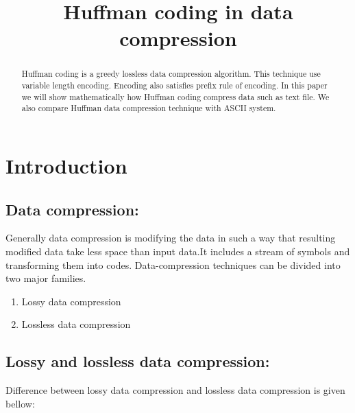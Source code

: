 \documentclass[conference]{IEEEtran}
\begin{document}
\title{Huffman coding in data compression}
\author{

}

\date{}
\maketitle


\begin{abstract}
Huffman coding is a greedy lossless data compression algorithm. This technique  use   variable length encoding. Encoding also satisfies prefix rule of encoding. In this paper we will show mathematically how Huffman coding  compress data such as text file. We also compare Huffman data compression technique with ASCII system.
    
\end{abstract}
\section{Introduction}
\label{sec:intro}
\subsection{\textbf{Data compression:}}
Generally data compression is modifying the data in such a way that resulting modified data take less space than input data.It includes a stream of symbols and transforming them into codes\textsc{\cite{nelson1995data}}.
Data-compression techniques can be divided into two major families\textsc{\cite{nelson1995data}}.


 \begin{enumerate}
 \label{list:into1}
 \item Lossy data compression
  \item Lossless data compression
  
\end{enumerate}

\subsection{\textbf{Lossy and lossless data compression:}}
Difference between lossy data compression and lossless data compression is given bellow:
\end{document}
